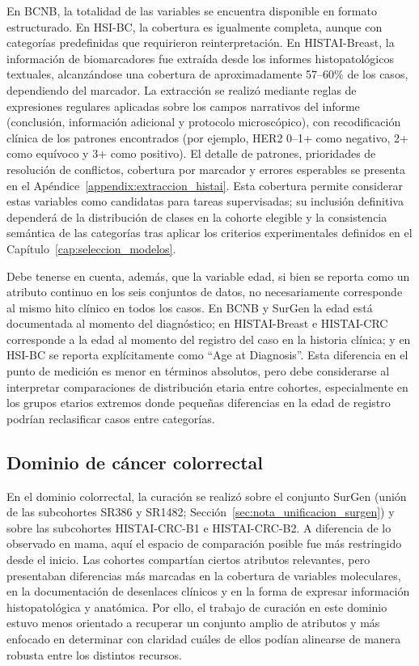 En BCNB, la totalidad de las variables se encuentra disponible en formato estructurado. En HSI-BC, la cobertura es igualmente completa, aunque con categorías predefinidas que requirieron reinterpretación. En HISTAI-Breast, la información de biomarcadores fue extraída desde los informes histopatológicos textuales, alcanzándose una cobertura de aproximadamente 57--60\% de los casos, dependiendo del marcador. La extracción se realizó mediante reglas de expresiones regulares aplicadas sobre los campos narrativos del informe (conclusión, información adicional y protocolo microscópico), con recodificación clínica de los patrones encontrados (por ejemplo, HER2 0--1+ como negativo, 2+ como equívoco y 3+ como positivo). El detalle de patrones, prioridades de resolución de conflictos, cobertura por marcador y errores esperables se presenta en el Apéndice~\ref{appendix:extraccion_histai}. Esta cobertura permite considerar estas variables como candidatas para tareas supervisadas; su inclusión definitiva dependerá de la distribución de clases en la cohorte elegible y la consistencia semántica de las categorías tras aplicar los criterios experimentales definidos en el Capítulo~\ref{cap:seleccion_modelos}. 

Debe tenerse en cuenta, además, que la variable edad, si bien se reporta como un atributo continuo en los seis conjuntos de datos, no necesariamente corresponde al mismo hito clínico en todos los casos. En BCNB y SurGen la edad está documentada al momento del diagnóstico; en HISTAI-Breast e HISTAI-CRC corresponde a la edad al momento del registro del caso en la historia clínica; y en HSI-BC se reporta explícitamente como ``Age at Diagnosis''. Esta diferencia en el punto de medición es menor en términos absolutos, pero debe considerarse al interpretar comparaciones de distribución etaria entre cohortes, especialmente en los grupos etarios extremos donde pequeñas diferencias en la edad de registro podrían reclasificar casos entre categorías.

\subsection{Dominio de cáncer colorrectal}

En el dominio colorrectal, la curación se realizó sobre el conjunto SurGen (unión de las subcohortes SR386 y SR1482; Sección~\ref{sec:nota_unificacion_surgen}) y sobre las subcohortes HISTAI-CRC-B1 e HISTAI-CRC-B2.
 A diferencia de lo observado en mama, aquí el espacio de comparación posible fue más restringido desde el inicio. Las cohortes compartían ciertos atributos relevantes, pero presentaban diferencias más marcadas en la cobertura de variables moleculares, en la documentación de desenlaces clínicos y en la forma de expresar información histopatológica y anatómica. Por ello, el trabajo de curación en este dominio estuvo menos orientado a recuperar un conjunto amplio de atributos y más enfocado en determinar con claridad cuáles de ellos podían alinearse de manera robusta entre los distintos recursos.

